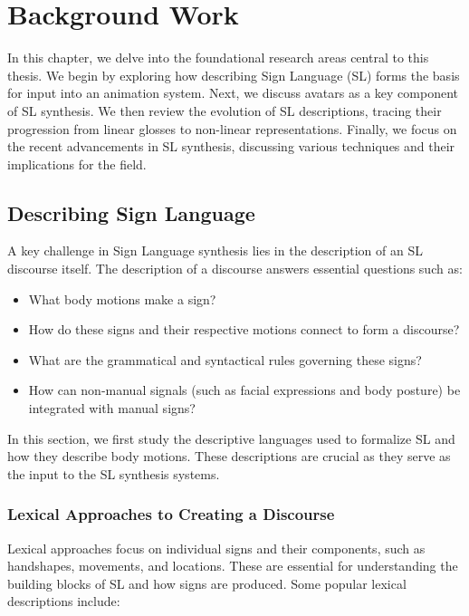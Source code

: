 \documentclass[../../main.tex]{subfiles}
\begin{document}
\chapter{Background Work}

In this chapter, we delve into the foundational research areas central to this thesis. We begin by exploring how describing Sign Language (SL) forms the basis for input into an animation system. Next, we discuss avatars as a key component of SL synthesis. We then review the evolution of SL descriptions, tracing their progression from linear glosses to non-linear representations. Finally, we focus on the recent advancements in SL synthesis, discussing various techniques and their implications for the field.

\section{Describing Sign Language}

A key challenge in Sign Language synthesis lies in the description of an SL discourse itself. The description of a discourse answers essential questions such as:

\begin{itemize}
  \item What body motions make a sign?
  \item How do these signs and their respective motions connect to form a discourse?
  \item What are the grammatical and syntactical rules governing these signs?
  \item How can non-manual signals (such as facial expressions and body posture) be integrated with manual signs?
\end{itemize}

In this section, we first study the descriptive languages used to formalize SL and how they describe body motions. These descriptions are crucial as they serve as the input to the SL synthesis systems.

\subsection{Lexical Approaches to Creating a Discourse}

Lexical approaches focus on individual signs and their components, such as handshapes, movements, and locations. These are essential for understanding the building blocks of SL and how signs are produced. Some popular lexical descriptions include:
\end{document}

